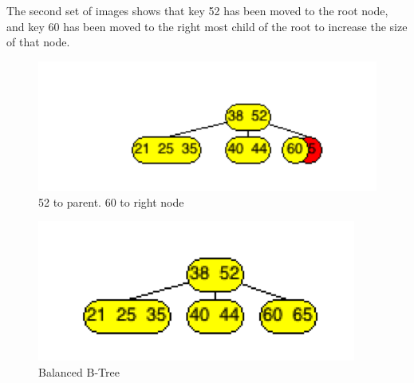 The second set of images shows that key 52 has been moved to the root node, and key 60 has been moved to the right most child of the root to increase the size of that node.

\begin{figure}[H]
\centering
\includegraphics{pictures/tree31.png}
\caption{52 to parent. 60 to right node}
\label{fig:tree31}
\end{figure}

\begin{figure}[H]
\centering
\includegraphics{pictures/tree32.png}
\caption{Balanced B-Tree}
\label{fig:tree32}
\end{figure}

